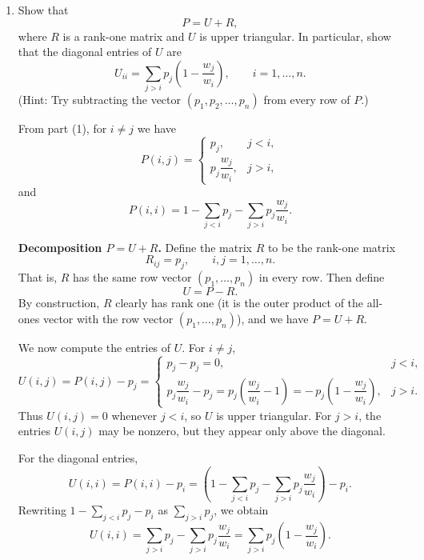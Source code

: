 \documentclass[answers,12pt,addpoints]{exam}
\begin{document}
\begin{enumerate}
\begin{solution}
\medskip
\noindent\textbf{Formula for $P(i,i)$.}
Finally, the probability of staying at $i$ is one minus the probability of
moving to any other state:
\[
P(i,i)
= 1 - \sum_{j\neq i} P(i,j)
= 1 - \sum_{j<i} p_j - \sum_{j>i} p_j\,\frac{w_j}{w_i}.
\]
This gives an explicit expression for $P(i,i)$ in terms of $\{p_j,w_j\}$.
    \end{solution}
    \item Show that
    \[
    P = U + R,
    \]
    where $R$ is a rank-one matrix and $U$ is upper triangular. In particular, show that the diagonal
    entries of $U$ are
    \[
    U_{ii} = \sum_{j>i} p_j\left(1 - \frac{w_j}{w_i}\right),
    \qquad i = 1,\ldots,n.
    \]
    (Hint: Try subtracting the vector $(p_1, p_2, \ldots, p_n)$ from every row of $P$.)
    \begin{solution}
        From part (1), for $i \neq j$ we have
\[
P(i,j) =
\begin{cases}
p_j, & j < i,\\[4pt]
p_j \dfrac{w_j}{w_i}, & j > i,
\end{cases}
\]
and
\[
P(i,i) = 1 - \sum_{j<i} p_j - \sum_{j>i} p_j \frac{w_j}{w_i}.
\]

\medskip
\noindent\textbf{Decomposition $P = U + R$.}
Define the matrix $R$ to be the rank-one matrix
\[
R_{ij} = p_j, \qquad i,j = 1,\dots,n.
\]
That is, $R$ has the same row vector $(p_1,\dots,p_n)$ in every row. Then define
\[
U = P - R.
\]
By construction, $R$ clearly has rank one (it is the outer product of the all-ones
vector with the row vector $(p_1,\dots,p_n)$), and we have $P = U + R$.

We now compute the entries of $U$. For $i \neq j$,
\[
U(i,j) = P(i,j) - p_j =
\begin{cases}
p_j - p_j = 0, & j < i,\\[6pt]
p_j \dfrac{w_j}{w_i} - p_j = p_j\!\left(\dfrac{w_j}{w_i} - 1\right)
= -\,p_j\!\left(1 - \dfrac{w_j}{w_i}\right), & j > i.
\end{cases}
\]
Thus $U(i,j) = 0$ whenever $j < i$, so $U$ is upper triangular. For $j>i$, the
entries $U(i,j)$ may be nonzero, but they appear only above the diagonal.

For the diagonal entries,
\[
U(i,i) = P(i,i) - p_i
= \left( 1 - \sum_{j<i} p_j - \sum_{j>i} p_j \frac{w_j}{w_i} \right) - p_i.
\]
Rewriting $1 - \sum_{j<i} p_j - p_i$ as $\sum_{j>i} p_j$, we obtain
\[
U(i,i)
= \sum_{j>i} p_j - \sum_{j>i} p_j \frac{w_j}{w_i}
= \sum_{j>i} p_j\left(1 - \frac{w_j}{w_i}\right).
\]


\end{solution}
\end{enumerate}
\end{document}
